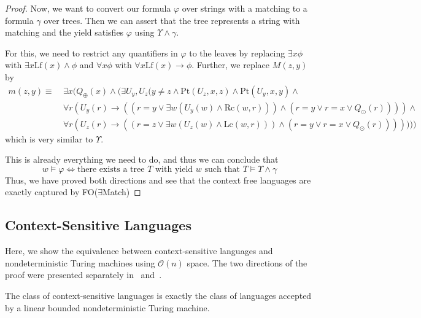 \begin{proof}
    Now, we want to convert our formula $\varphi$ over strings with a matching to a formula $\gamma$ over trees.
    Then we can assert that the tree represents a string with matching and the yield satisfies $\varphi$ using $\Upsilon \land \gamma$.

    For this, we need to restrict any quantifiers in $\varphi$ to the leaves by replacing $\exists x \phi$ with $\exists x \text{Lf}(x) \land \phi$ and $\forall x \phi$ with $\forall x \text{Lf}(x) \to \phi$.
    Further, we replace $M(z, y)$ by
    \begin{align*}
        m(z, y) \equiv~& \exists x ( Q_{\oplus}(x) \land ( \exists U_y, U_z (y \neq z \land \text{Pt}(U_z, x, z) \land \text{Pt}(U_y, x, y) \land \\
        &\forall r (U_y(r) \to ((r = y \lor \exists w (U_y(w) \land \text{Rc}(w, r)))\land (r = y \lor r = x \lor Q_{\odot}(r)))) \land \\
        &\forall r (U_z(r) \to ((r = z \lor \exists w (U_z(w) \land \text{Lc}(w, r)))\land (r = y \lor r = x \lor Q_{\odot}(r)))))))
    \end{align*}
    which is very similar to $\Upsilon$.

    This is already everything we need to do, and thus we can conclude that
    \[w \models \varphi \Leftrightarrow \text{there exists a tree $T$ with yield $w$ such that } T \models \Upsilon \land \gamma \]
    Thus, we have proved both directions and see that the context free languages are exactly captured by \acs{FO}($\exists$Match)
\end{proof}

\subsection{Context-Sensitive Languages}\label{subsec:des-context-sensitive-languages-context-app}

Here, we show the equivalence between context-sensitive languages and nondeterministic Turing machines using $\mathcal{O}(n)$ space.
The two directions of the proof were presented separately in~\cite{Kuroda1964} and~\cite{Landweber1963}.

\begin{theorem}
    \label{thm:nspacecontextsensitive}
    The class of context-sensitive languages is exactly the class of languages accepted by a linear bounded nondeterministic Turing machine.
\end{theorem}

